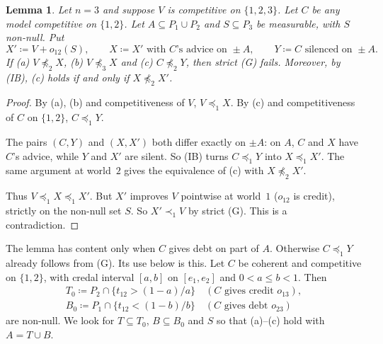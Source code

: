 \documentclass[11pt]{article}
\newtheorem{lemma}[theorem]{Lemma}
\theoremstyle{definition}\newtheorem{definition}[theorem]{Definition}
\theoremstyle{remark}\newtheorem{remark}[theorem]{Remark}
\begin{document}
\begin{lemma}\label{lem:chain}
Let $n=3$ and suppose $V$ is competitive on $\{1,2,3\}$. Let $C$ be any model
competitive on $\{1,2\}$. Let $A\subseteq P_1\cup P_2$ and $S\subseteq P_3$ be
measurable, with $S$ non-null. Put
\[
 X'\coloneqq V+o_{12}(S),\qquad
 X\coloneqq X'\text{ with $C$'s advice on }\pm A,\qquad
 Y\coloneqq C\text{ silenced on }\pm A.
\]
If (a) $V\not\preceq_2X$, (b) $V\not\preceq_3X$ and (c) $C\not\preceq_2Y$,
then strict (G) fails. Moreover, by (IB), (c) holds if and only if
$X\not\preceq_2X'$.
\end{lemma}
\begin{proof}
By (a), (b) and competitiveness of $V$, $V\preceq_1X$. By (c) and
competitiveness of $C$ on $\{1,2\}$, $C\preceq_1Y$.

The pairs $(C,Y)$ and $(X,X')$ both differ exactly on $\pm A$: on $A$, $C$ and
$X$ have $C$'s advice, while $Y$ and $X'$ are silent. So (IB) turns
$C\preceq_1Y$ into $X\preceq_1X'$. The same argument at world~$2$ gives the
equivalence of (c) with $X\not\preceq_2X'$.

Thus $V\preceq_1X\preceq_1X'$. But $X'$ improves $V$ pointwise at world~$1$
($o_{12}$ is credit), strictly on the non-null set $S$. So $X'\prec_1V$ by
strict (G). This is a contradiction.
\end{proof}

The lemma has content only when $C$ gives debt on part of $A$. Otherwise
$C\preceq_1Y$ already follows from (G). Its use below is this. Let $C$ be
coherent and competitive on $\{1,2\}$, with credal interval $[a,b]$ on
$[e_1,e_2]$ and $0<a\le b<1$. Then
\begin{gather*}
 T_0\coloneqq P_2\cap\{t_{12}>(1-a)/a\}\quad(\text{$C$ gives credit }o_{13}),\\
 B_0\coloneqq P_1\cap\{t_{12}<(1-b)/b\}\quad(\text{$C$ gives debt }o_{23})
\end{gather*}
are non-null. We look for $T\subseteq T_0$, $B\subseteq B_0$ and $S$ so that
(a)--(c) hold with $A=T\cup B$.
\end{document}

